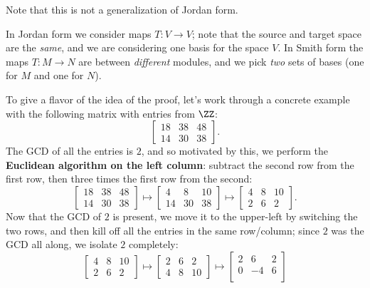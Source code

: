 \begin{remark}
	Note that this is not a generalization of Jordan form.
	\begin{itemize}
		\ii In Jordan form we consider maps $T : V \to V$;
		note that the source and target space are the \emph{same},
		and we are considering one basis for the space $V$.
		\ii In Smith form the maps $T : M \to N$ are between
		\emph{different} modules, and we pick \emph{two} sets of bases
		(one for $M$ and one for $N$).
	\end{itemize}
\end{remark}

\begin{example}
	To give a flavor of the idea of the proof,
	let's work through a concrete example with the following
	matrix with entries from $\ZZ$:
	\[ \begin{bmatrix} 
			18 & 38 & 48 \\
			14 & 30 & 38
		\end{bmatrix}.  \]
	The GCD of all the entries is $2$, and so motivated by this,
	we perform the \textbf{Euclidean algorithm on the left column}:
	subtract the second row from the first row,
	then three times the first row from the second:
	\[ 
		\begin{bmatrix} 
			18 & 38 & 48 \\
			14 & 30 & 38
		\end{bmatrix} 
		\mapsto
		\begin{bmatrix} 
			4 & 8 & 10 \\
			14 & 30 & 38
		\end{bmatrix}
		\mapsto
		\begin{bmatrix} 
			4 & 8 & 10 \\
			2 & 6 & 2
		\end{bmatrix}.
	\]
	Now that the GCD of $2$ is present, we move it to the upper-left
	by switching the two rows,
	and then kill off all the entries in the same row/column;
	since $2$ was the GCD all along, we isolate $2$ completely:
	\[
		\begin{bmatrix} 
			4 & 8 & 10 \\
			2 & 6 & 2
		\end{bmatrix}
		\mapsto
		\begin{bmatrix} 
			2 & 6 & 2 \\
			4 & 8 & 10
		\end{bmatrix}
		\mapsto 
		\begin{bmatrix} 
			2 & 6 & 2 \\
			0 & -4 & 6 \\

\end{bmatrix}\]
\end{example}
